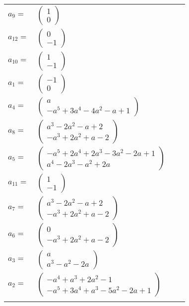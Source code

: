 \documentclass[1p]{elsarticle_modified}
\theoremstyle{definition}
\begin{document}
\begin{tabular}{m{7pt} m{180pt} m{7pt} m{180pt} }
\flushright $a_{9}=$&$\begin{pmatrix}1\\0\end{pmatrix}$ \\
\flushright $a_{12}=$&$\begin{pmatrix}0\\-1\end{pmatrix}$ \\
\flushright $a_{10}=$&$\begin{pmatrix}1\\-1\end{pmatrix}$ \\
\flushright $a_{1}=$&$\begin{pmatrix}-1\\0\end{pmatrix}$ \\
\flushright $a_{4}=$&$\begin{pmatrix}a\\- a^5+3 a^4-4 a^2- a+1\end{pmatrix}$ \\
\flushright $a_{8}=$&$\begin{pmatrix}a^3-2 a^2- a+2\\- a^3+2 a^2+a-2\end{pmatrix}$ \\
\flushright $a_{5}=$&$\begin{pmatrix}- a^5+2 a^4+2 a^3-3 a^2-2 a+1\\a^4-2 a^3- a^2+2 a\end{pmatrix}$ \\
\flushright $a_{11}=$&$\begin{pmatrix}1\\-1\end{pmatrix}$ \\
\flushright $a_{7}=$&$\begin{pmatrix}a^3-2 a^2- a+2\\- a^3+2 a^2+a-2\end{pmatrix}$ \\
\flushright $a_{6}=$&$\begin{pmatrix}0\\- a^3+2 a^2+a-2\end{pmatrix}$ \\
\flushright $a_{3}=$&$\begin{pmatrix}a\\a^3- a^2-2 a\end{pmatrix}$ \\
\flushright $a_{2}=$&$\begin{pmatrix}- a^4+a^3+2 a^2-1\\- a^5+3 a^4+a^3-5 a^2-2 a+1\end{pmatrix}$\\&\end{tabular}
\end{document}
